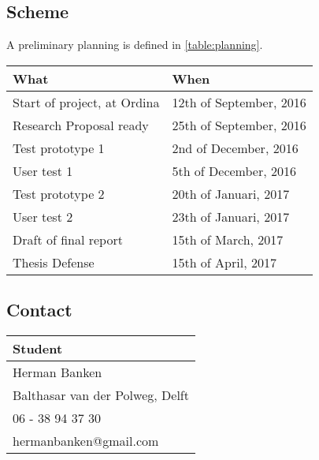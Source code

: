 \subsection{Scheme}%
A preliminary planning is defined in \autoref{table:planning}.

\begin{table}[h]
    \label{table:planning}
    \centering
    \begin{tabular}{@{}ll@{}}
        \textbf{What}               & \textbf{When}           \\ 
        \hline
        Start of project, at Ordina & 12th of September, 2016 \\ 
        Research Proposal ready     & 25th of September, 2016 \\ 
        \hline
        Test prototype 1            & 2nd of December, 2016   \\ 
        User test 1                 & 5th of December, 2016   \\ 
        \hline
        Test prototype 2            & 20th of Januari, 2017   \\ 
        User test 2                 & 23th of Januari, 2017   \\ 
        \hline
        Draft of final report       & 15th of March, 2017     \\ 
        \hline
        Thesis Defense              & 15th of April, 2017     \\ 
    \end{tabular}
\end{table}

\subsection{Contact}

\begin{table}[h]
    \centering
    \begin{tabular}{@{}l@{}}
        \textbf{Student}                \\ 
        \hline
        Herman Banken                   \\ 
        Balthasar van der Polweg, Delft \\ 
        06 - 38 94 37 30                \\ 
        hermanbanken@gmail.com          \\ 
    \end{tabular}
\end{table}

